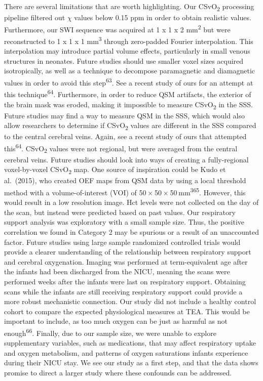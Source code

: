 \documentclass[
  letterpaper,
  DIV=11,
  numbers=noendperiod]{scrartcl}
\begin{document}
There are several limitations that are worth highlighting. Our
CSvO\textsubscript{2} processing pipeline filtered out \(\chi\) values
below 0.15 ppm in order to obtain realistic values. Furthermore, our SWI
sequence was acquired at 1 x 1 x 2 mm\textsuperscript{2} but were
reconstructed to 1 x 1 x 1 mm\textsuperscript{3} through zero-padded
Fourier interpolation. This interpolation may introduce partial volume
effects, particularly in small venous structures in neonates. Future
studies should use smaller voxel sizes acquired isotropically, as well
as a technique to decompose paramagnetic and diamagnetic values in order
to avoid this step\textsuperscript{63}. See a recent study of ours for
an attempt at this technique\textsuperscript{64}. Furthermore, in order
to reduce QSM artifacts, the exterior of the brain mask was eroded,
making it impossible to measure CSvO\textsubscript{2} in the SSS. Future
studies may find a way to measure QSM in the SSS, which would also allow
researchers to determine if CSvO\textsubscript{2} values are different
in the SSS compared to the central cerebral veins. Again, see a recent
study of ours that attempted this\textsuperscript{64}.
CSvO\textsubscript{2} values were not regional, but were averaged from
the central cerebral veins. Future studies should look into ways of
creating a fully-regional voxel-by-voxel CSvO\textsubscript{2} map. One
source of inspiration could be Kudo et al.~(2015), who created OEF maps
from QSM data by using a local threshold method with a
volume-of-interest (VOI) of
50 × 50 × 50 mm\textsuperscript{3}\textsuperscript{65}. However, this
would result in a low resolution image. Hct levels were not collected on
the day of the scan, but instead were predicted based on past values.
Our respiratory support analysis was exploratory with a small sample
size. Thus, the positive correlation we found in Category 2 may be
spurious or a result of an unaccounted factor. Future studies using
large sample randomized controlled trials would provide a clearer
understanding of the relationship between respiratory support and
cerebral oxygenation. Imaging was performed at term-equivalent age after
the infants had been discharged from the NICU, meaning the scans were
performed weeks after the infants were last on respiratory support.
Obtaining scans while the infants are still receiving respiratory
support could provide a more robust mechanistic connection. Our study
did not include a healthy control cohort to compare the expected
physiological measures at TEA. This would be important to include, as
too much oxygen can be just as harmful as not
enough\textsuperscript{66}. Finally, due to our sample size, we were
unable to explore supplementary variables, such as medications, that may
affect respiratory uptake and oxygen metabolism, and patterns of oxygen
saturations infants experience during their NICU stay. We see our study
as a first step, and that the data shows promise to direct a larger
study where these confounds can be addressed.
\end{document}
